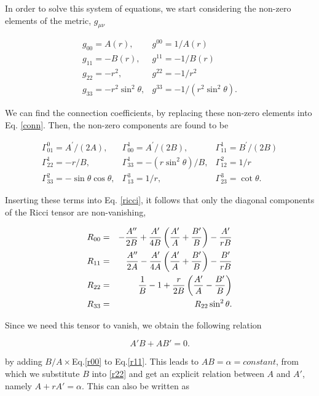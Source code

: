 \documentclass[letterpaper,11pt,onecolumn]{article}
\begin{document}
In order to solve this system of equations, we start considering the non-zero elements of the metric, $g_{\mu\nu}$

$$
\begin{array}{ll}
g_{00}=A(r), & g^{00}=1 / A(r) \\
g_{11}=-B(r), & g^{11}=-1 / B(r) \\
g_{22}=-r^{2}, & g^{22}=-1 / r^{2} \\
g_{33}=-r^{2} \sin ^{2} \theta, & g^{33}=-1 /\left(r^{2} \sin ^{2} \theta\right).
\end{array}
$$

We can find the connection coefficients, by replacing these non-zero elements into Eq. \ref{conn}. Then, the non-zero components are found to be

$$
\begin{array}{lll}
\Gamma_{01}^{0}=A^{\prime} /(2 A), & \Gamma_{00}^{1}=A^{\prime} /(2 B), & \Gamma_{11}^{1}=B^{\prime} /(2 B) \\
\Gamma_{22}^{1}=-r / B, & \Gamma_{33}^{1}=-\left(r \sin ^{2} \theta\right) / B, & \Gamma_{12}^{2}=1 / r \\
\Gamma_{33}^{2}=-\sin \theta \cos \theta, & \Gamma_{13}^{3}=1 / r, & \Gamma_{23}^{3}=\cot \theta.
\end{array}
$$

Inserting these terms into Eq. \ref{ricci}, it follows that only the diagonal components of the Ricci tensor are non-vanishing, 

\begin{eqnarray}
\centering
R_{00}&=&-\frac{A^{\prime \prime}}{2 B}+\frac{A^{\prime}}{4 B}\left(\frac{A^{\prime}}{A}+\frac{B^{\prime}}{B}\right)-\frac{A^{\prime}}{r B} \label{r00}\\
R_{11}&=&\frac{A^{\prime \prime}}{2 A}-\frac{A^{\prime}}{4 A}\left(\frac{A^{\prime}}{A}+\frac{B^{\prime}}{B}\right)-\frac{B^{\prime}}{r B} \label{r11}\\
R_{22}&=&\frac{1}{B}-1+\frac{r}{2 B}\left(\frac{A^{\prime}}{A}-\frac{B^{\prime}}{B}\right)\label{r22} \\
R_{33}&=&R_{22} \sin ^{2} \theta\label{r33}.
\end{eqnarray}

Since we need this tensor to vanish, we obtain the following relation

\begin{equation}
     A'B+AB'=0.\nonumber
\end{equation}

by adding $B/A \times$Eq.\ref{r00} to Eq.\ref{r11}. This leads to $AB=\alpha=constant$, from which we substitute $B$ into \ref{r22} and get an explicit relation between $A$ and $A'$, namely $A+rA'=\alpha$. This can also be written as
\end{document}
